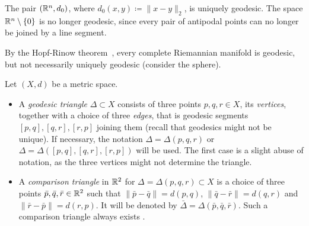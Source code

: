 \begin{bsp} The pair \((\mathbb{R}^n, d_0)\), where \(d_0(x,y) \coloneqq \|x - y\|_2\), is uniquely geodesic. The space \(\mathbb{R}^n \setminus \{0\}\) is no longer geodesic, since every pair of antipodal points can no longer be joined by a line segment.
\end{bsp}

\begin{bsp} By the Hopf-Rinow theorem\ \cite{hopf-rinow}, every complete Riemannian manifold is geodesic, but not necessarily uniquely geodesic (consider the sphere).
\end{bsp}

\begin{defin}
  Let \((X,d)\) be a metric space.\vspace{-6pt}
  \begin{itemize}
  \item A \emph{geodesic triangle} \(\Delta \subset X\) consists of three points \(p,q,r \in X\), its \emph{vertices}, together with a choice of three \emph{edges}, that is geodesic segments \([p,q], [q,r], [r, p]\) joining them (recall that geodesics might not be unique). If necessary, the notation \(\Delta = \Delta(p,q,r)\) or \(\Delta = \Delta([p,q], [q,r], [r,p])\) will be used. The first case is a slight abuse of notation, as the three vertices might not determine the triangle.
  \item A \emph{comparison triangle} in \(\mathbb{R}^2\) for \(\Delta = \Delta(p,q,r) \subset X\) is a choice of three points \(\bar p, \bar q, \bar r \in \mathbb{R}^2\) such that \(\|\bar p- \bar q\| = d(p, q)\), \(\|\bar q- \bar r\| = d(q, r)\) and \(\|\bar r- \bar p\| = d(r, p)\). It will be denoted by \(\bar \Delta = \Delta(\bar p, \bar q, \bar r)\). Such a comparison triangle always exists \cite[c.\,f.][Sec.\ I.2]{MR1744486}.
  \end{itemize}
\end{defin}

